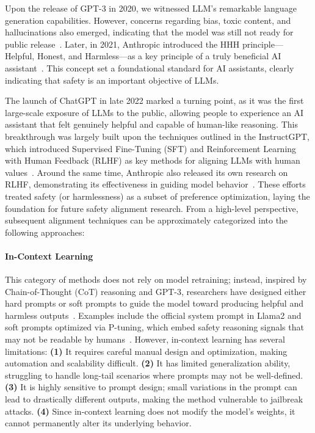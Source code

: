 
Upon the release of GPT-3 in 2020, we witnessed LLM's remarkable language generation capabilities. However, concerns regarding bias, toxic content, and hallucinations also emerged, indicating that the model was still not ready for public release~\cite{brown2020language}. 
Later, in 2021, Anthropic introduced the HHH principle—Helpful, Honest, and Harmless—as a key principle of a truly beneficial AI assistant~\cite{askell2021general}. This concept set a foundational standard for AI assistants, clearly indicating that safety is an important objective of LLMs.

The launch of ChatGPT in late 2022 marked a turning point, as it was the first large-scale exposure of LLMs to the public, allowing people to experience an AI assistant that felt genuinely helpful and capable of human-like reasoning. This breakthrough was largely built upon the techniques outlined in the InstructGPT, which introduced Supervised Fine-Tuning (SFT) and Reinforcement Learning with Human Feedback (RLHF) as key methods for aligning LLMs with human values~\cite{ouyang2022training}. Around the same time, Anthropic also released its own research on RLHF, demonstrating its effectiveness in guiding model behavior~\cite{bai2022training}. These efforts treated safety (or harmlessness) as a subset of preference optimization, laying the foundation for future safety alignment research. From a high-level perspective, subsequent alignment techniques can be approximately categorized into the following approaches:  

\paragraph{In-Context Learning}  
This category of methods does not rely on model retraining; instead, inspired by Chain-of-Thought (CoT) reasoning and GPT-3, researchers have designed either hard prompts or soft prompts to guide the model toward producing helpful and harmless outputs~\cite{wei2022chain,brown2020language}. Examples include the official system prompt in Llama2 and soft prompts optimized via P-tuning, which embed safety reasoning signals that may not be readable by humans~\cite{touvron2023llama,xie2023defending}. 
However, in-context learning has several limitations: \textbf{(1)} It requires careful manual design and optimization, making automation and scalability difficult. \textbf{(2)} It has limited generalization ability, struggling to handle long-tail scenarios where prompts may not be well-defined. \textbf{(3)} It is highly sensitive to prompt design; small variations in the prompt can lead to drastically different outputs, making the method vulnerable to jailbreak attacks. \textbf{(4)} Since in-context learning does not modify the model's weights, it cannot permanently alter its underlying behavior.  

